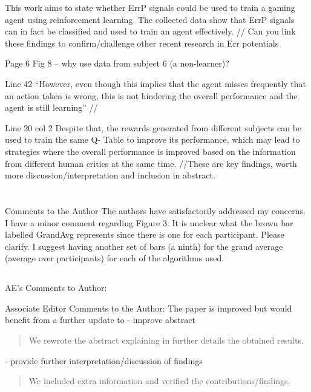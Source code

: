 \documentclass[journal,onecolumn,12pt]{IEEEtran}
\begin{document}
This work aims to state whether ErrP signals could be used to train a gaming agent using reinforcement learning. The collected data show that ErrP signals can in fact be classified and used to train an agent effectively. // Can you link these findings to confirm/challenge other recent research in Err potentials


Page 6
Fig 8 – why use data from subject 6 (a non-learner)?


Line 42 “However, even though this implies that the agent misses frequently that an action taken is wrong, this is not hindering the overall performance and the agent is still learning” //


Line 20 col 2 Despite that, the rewards generated from different subjects can be used to train the same Q- Table to improve its performance, which may lead to strategies where the overall performance is improved based on the information from different human critics at the same time.
//These are key findings, worth more discussion/interpretation and inclusion in abstract.



\section*{}

Comments to the Author
The authors have satisfactorily addressed my concerns. I have a minor comment regarding Figure 3. It is unclear what the brown bar labelled GrandAvg represents since there is one for each participant. Please clarify. I suggest having another set of bars (a ninth) for the grand average (average over participants) for each of the algorithms used.


\subsection*{}
AE's Comments to Author:

Associate Editor
Comments to the Author:
The paper is improved but would benefit from a further update to
- improve abstract

\begin{quotation}
{\color{blue}
We rewrote the abstract explaining in further details the obtained results.  
}
\end{quotation}


- provide further interpretation/discussion of findings

\begin{quotation}
{\color{blue}
We included extra information and verified the contributions/findings.
}
\end{quotation}
\end{document}
